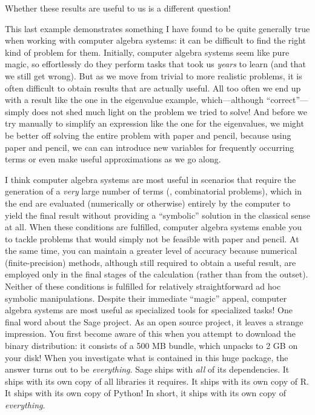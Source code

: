 Whether these results are useful to us is a different question!

This last example demonstrates something I have found to be quite
generally true when working with computer algebra systems: it can be
difficult to find the right kind of problem for them. Initially,
computer algebra systems seem like pure magic, so effortlessly do they
perform tasks that took us \emph{years} to learn (and that we still
get wrong). But as we move from trivial to more realistic problems, it
is often difficult to obtain results that are actually useful. All too
often we end up with a result like the one in the eigenvalue
example, which---although ``correct''---simply does not shed much
light on the problem we tried to solve!  And before we try manually to
simplify an expression like the one for the eigenvalues, we might be
better off solving the entire problem with paper and pencil, because
using paper and pencil, we can can introduce new variables for
frequently occurring terms or even make useful approximations as we
go along.

I think computer algebra systems are most useful in scenarios that
require the generation of a \emph{very} large number of terms (\eg,
combinatorial problems), which in the end are evaluated (numerically
or otherwise) entirely by the computer to yield the final result
without providing a ``symbolic'' solution in the classical sense at
all. When these conditions are fulfilled, computer algebra systems
enable you to tackle problems that would simply not be feasible with
paper and pencil. At the same time, you can maintain a greater level
of accuracy because numerical (finite-precision) methods, although
still required to obtain a useful result, are employed only in the
final stages of the calculation (rather than from the outset).\vadjust{\pagebreak} Neither
of these conditions is fulfilled for relatively straightforward ad hoc
symbolic manipulations. Despite their immediate ``magic'' appeal,
computer algebra systems are most useful as specialized tools for
specialized tasks!
One final word about the Sage project.  As an open source project, it
leaves a strange impression. You first become aware of this when you
attempt to download the binary distribution: it consists of a 500 MB
bundle, which unpacks to 2 GB on your disk! When you investigate what
is contained in this huge package, the answer turns out to be
\emph{everything}. Sage ships with \emph{all} of its dependencies. It
ships with its own copy of all libraries it requires. It ships with
its own copy of R. It ships with its own copy of Python!  In short, it
ships with its own copy of \emph{everything}.

